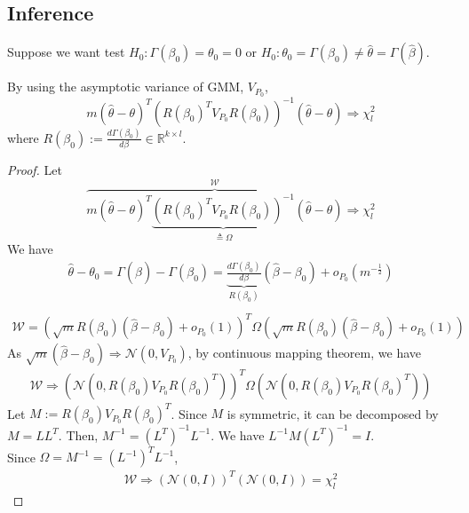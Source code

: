 \documentclass[11pt]{elegantbook}
\begin{document}
\subsection{Inference}
Suppose we want test $H_0:\Gamma(\beta_0)=\theta_0=0$ or $H_0: \theta_0=\Gamma(\beta_0)\neq\hat{\theta}=\Gamma(\hat{\beta})$.
\begin{theorem}
    By using the asymptotic variance of GMM, $V_{{P_0}}$,
    $$m(\hat{\theta}-\theta)^T\left(R(\beta_0)^TV_{P_0}R(\beta_0)\right)^{-1}(\hat{\theta}-\theta) \Rightarrow \chi^2_l$$
    where $R(\beta_0):=\frac{d \Gamma(\beta_0)}{d\beta}\in \mathbb{R}^{k\times l}$.
\end{theorem}
\begin{proof}
    Let
    $$\overbrace{m(\hat{\theta}-\theta)^T\underbrace{\left(R(\beta_0)^TV_{P_0}R(\beta_0)\right)^{-1}}_{\triangleq\Omega}(\hat{\theta}-\theta)}^\mathcal{W} \Rightarrow \chi^2_l$$
    We have
    \begin{equation}
        \begin{aligned}
            \hat{\theta}-\theta_0=\Gamma(\hat{\beta})-\Gamma(\beta_0)=\underbrace{\frac{d\Gamma(\beta_0)}{d\beta}}_{R(\beta_0)}(\hat{\beta}-\beta_0)+o_{P_0}(m^{-\frac{1}{2}})\\
        \end{aligned}
        \nonumber
    \end{equation}
    \begin{equation}
        \begin{aligned}
            \mathcal{W}=\left(\sqrt{m}R(\beta_0)(\hat{\beta}-\beta_0)+o_{P_0}(1)\right)^T\Omega \left(\sqrt{m}R(\beta_0)(\hat{\beta}-\beta_0)+o_{P_0}(1)\right)
        \end{aligned}
        \nonumber
    \end{equation}
    As $\sqrt{m}\left(\hat{\beta}-\beta_0\right)\Rightarrow \mathcal{N}(0,V_{P_0})$, by continuous mapping theorem, we have
    \begin{equation}
        \begin{aligned}
            \mathcal{W} \Rightarrow \left(\mathcal{N}(0,R(\beta_0)V_{P_0}R(\beta_0)^T)\right)^T\Omega\left(\mathcal{N}(0,R(\beta_0)V_{P_0}R(\beta_0)^T)\right)
        \end{aligned}
        \nonumber
    \end{equation}
    Let $M:=R(\beta_0)V_{P_0}R(\beta_0)^T$. Since $M$ is symmetric, it can be decomposed by $M=LL^T$. Then, $M^{-1}=(L^{T})^{-1}L^{-1}$. We have $L^{-1}M(L^{T})^{-1}=I$.\\
    Since $\Omega=M^{-1}=(L^{-1})^TL^{-1}$,
    \begin{equation}
        \begin{aligned}
            \mathcal{W}\Rightarrow \left(\mathcal{N}(0,I)\right)^T\left(\mathcal{N}(0,I)\right)=\chi^2_l
        \end{aligned}
        \nonumber
    \end{equation}
\end{proof}
\end{document}
